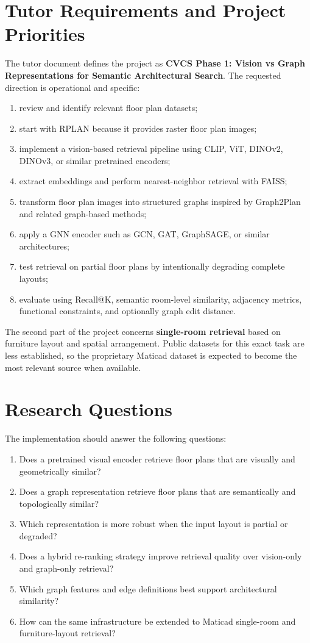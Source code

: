 \documentclass[11pt,a4paper]{article}
\begin{document}
\section{Tutor Requirements and Project Priorities}

The tutor document defines the project as \textbf{CVCS Phase 1: Vision vs Graph Representations for Semantic Architectural Search}. The requested direction is operational and specific:
\begin{enumerate}
    \item review and identify relevant floor plan datasets;
    \item start with RPLAN because it provides raster floor plan images;
    \item implement a vision-based retrieval pipeline using CLIP, ViT, DINOv2, DINOv3, or similar pretrained encoders;
    \item extract embeddings and perform nearest-neighbor retrieval with FAISS;
    \item transform floor plan images into structured graphs inspired by Graph2Plan and related graph-based methods;
    \item apply a GNN encoder such as GCN, GAT, GraphSAGE, or similar architectures;
    \item test retrieval on partial floor plans by intentionally degrading complete layouts;
    \item evaluate using Recall@K, semantic room-level similarity, adjacency metrics, functional constraints, and optionally graph edit distance.
\end{enumerate}

The second part of the project concerns \textbf{single-room retrieval} based on furniture layout and spatial arrangement. Public datasets for this exact task are less established, so the proprietary Maticad dataset is expected to become the most relevant source when available.

\section{Research Questions}

The implementation should answer the following questions:
\begin{enumerate}
    \item Does a pretrained visual encoder retrieve floor plans that are visually and geometrically similar?
    \item Does a graph representation retrieve floor plans that are semantically and topologically similar?
    \item Which representation is more robust when the input layout is partial or degraded?
    \item Does a hybrid re-ranking strategy improve retrieval quality over vision-only and graph-only retrieval?
    \item Which graph features and edge definitions best support architectural similarity?
    \item How can the same infrastructure be extended to Maticad single-room and furniture-layout retrieval?
\end{enumerate}
\end{document}
